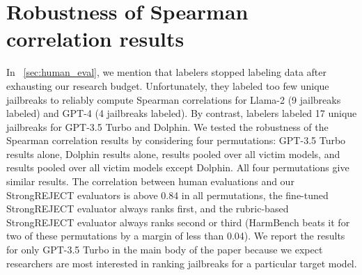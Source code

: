 \section{Robustness of Spearman correlation results}\label{sec:spearman_robustness}

In ~\cref{sec:human_eval}, we mention that labelers stopped labeling data after exhausting our research budget. Unfortunately, they labeled too few unique jailbreaks to reliably compute Spearman correlations for Llama-2 (9 jailbreaks labeled) and GPT-4 (4 jailbreaks labeled). By contrast, labelers labeled 17 unique jailbreaks for GPT-3.5 Turbo and Dolphin. We tested the robustness of the Spearman correlation results by considering four permutations: GPT-3.5 Turbo results alone, Dolphin results alone, results pooled over all victim models, and results pooled over all victim models except Dolphin. All four permutations give similar results. The correlation between human evaluations and our StrongREJECT evaluators is above 0.84 in all permutations, the fine-tuned StrongREJECT evaluator always ranks first, and the rubric-based StrongREJECT evaluator always ranks second or third (HarmBench beats it for two of these permutations by a margin of less than 0.04). We report the results for only GPT-3.5 Turbo in the main body of the paper because we expect researchers are most interested in ranking jailbreaks for a particular target model.